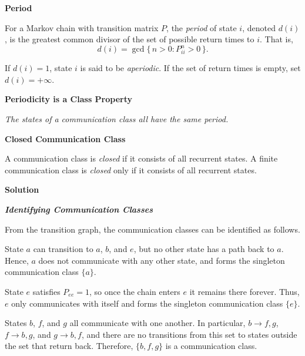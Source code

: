 \documentclass[hidelinks]{article}
\begin{document}
{\color{darkgreen}
\noindent \textbf{Period}
}

{\color{darkgreen}
\noindent For a Markov chain with transition matrix $P$, the \emph{period} of state $i$,
denoted $d(i)$, is the greatest common divisor of the set of possible return
times to $i$. That is,
\[
d(i) = \gcd\{\, n > 0 : P^{n}_{ii} > 0 \,\}.
\]
}

{\color{darkgreen}
\noindent If $d(i) = 1$, state $i$ is said to be \emph{aperiodic}. If the set of return
times is empty, set $d(i) = +\infty$.
}

\medskip

{\color{darkgreen}
\noindent \textbf{Periodicity is a Class Property}
}

\medskip

{\color{darkgreen}
\noindent \emph{The states of a communication class all have the same period.}
}

\medskip

{\color{darkgreen} \noindent \textbf{Closed Communication Class}

\noindent A communication class is \emph{closed} if it consists of all recurrent states.
A finite communication class is \emph{closed} only if it consists of all recurrent states.
}

\smallskip

\noindent \textbf{Solution}

\smallskip

\noindent \textit{\textbf{Identifying Communication Classes}}

\noindent From the transition graph, the communication classes can be identified as follows.

\smallskip

\noindent State $a$ can transition to $a$, $b$, and $e$, but no other state has a path back to $a$. Hence, $a$ does not communicate with any other state, and forms the
singleton communication class $\{a\}$.

\smallskip

\noindent State $e$ satisfies $P_{ee} = 1$, so once the chain enters $e$ it remains there forever. Thus, $e$ only communicates with itself and forms the singleton communication class $\{e\}$.

\smallskip

\noindent States $b$, $f$, and $g$ all communicate with one another. In particular, $b \to f,g$, $f \to b,g$, and $g \to b,f$, and there are no transitions from this set to states outside the set that return back. Therefore, $\{b,f,g\}$ is a communication class.
\end{document}
